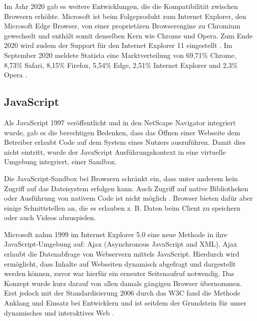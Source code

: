 Im Jahr 2020 gab es weitere Entwicklungen, die die Kompatibilität zwischen Browsern erhöhte. Microsoft ist beim Folgeprodukt zum Internet Explorer, den Microsoft Edge Browser, von einer proprietären Browserengine zu Chromium gewechselt \cite{MicrosoftEdgeChromium} und enthält somit denselben Kern wie Chrome und Opera. Zum Ende 2020 wird zudem der Support für den Internet Explorer 11 eingestellt \cite{MicrosoftInternetExplorerDeprecation}. Im September 2020 meldete Statista eine Marktverteilung von 69,71\% Chrome, 8,73\% Safari, 8,15\% Firefox, 5,54\% Edge, 2,51\% Internet Explorer und 2,3\% Opera \cite{StatistaBrowserMarketshare}.

\subsection{JavaScript}

Als JavaScript 1997 veröffentlicht und in den NetScape Navigator integriert wurde, gab es die berechtigen Bedenken, dass das Öffnen einer Webseite dem Betreiber erlaubt Code auf dem System eines Nutzers auszuführen. Damit dies nicht eintritt, wurde der JavaScript Ausführungskontext in eine virtuelle Umgebung integriert, einer Sandbox. \cite{LearningJavaScript}

Die JavaScript-Sandbox bei Browsern schränkt ein, dass unter anderem kein Zugriff auf das Dateisystem erfolgen kann. Auch Zugriff auf native Bibliotheken oder Ausführung von nativem Code ist nicht möglich \cite{TheSpyInTheSandbox}. Browser bieten dafür aber einige Schnittstellen an, die es erlauben z. B. Daten beim Client zu speichern oder auch Videos abzuspielen.


Microsoft nahm 1999 im Internet Explorer 5.0 eine neue Methode in ihre JavaScript-Umgebung auf: Ajax (Asynchronous JavaScript and XML). Ajax erlaubt die Datenabfrage von Webservern mittels JavaScript. Hierdurch wird ermöglicht, dass Inhalte auf Webseiten dynamisch abgefragt und dargestellt werden können, zuvor war hierfür ein erneuter Seitenaufruf notwendig. Das Konzept wurde kurz darauf von allen damals gängigen Browser übernommen. Erst jedoch mit der Standardisierung 2006 durch das W3C \cite{TheXMLHttpRequestObject} fand die Methode Anklang und Einsatz bei Entwicklern und ist seitdem der Grundstein für unser dynamisches und interaktives Web \cite{TheStoryOfXMLHTTP}.

